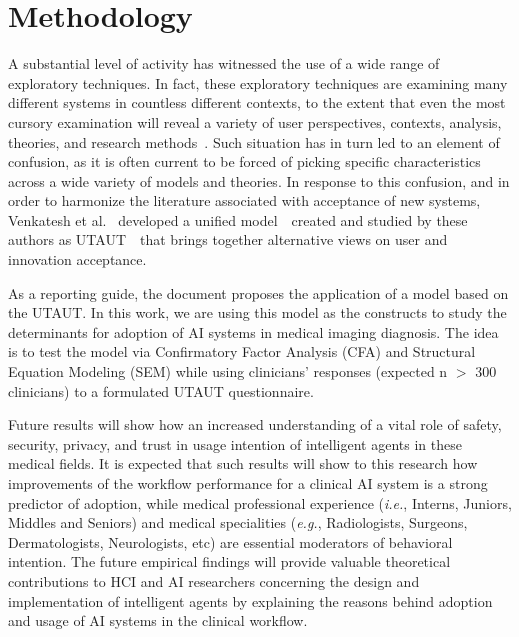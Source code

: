 
\section{Methodology}
\label{sec:sec003}

A substantial level of activity has witnessed the use of a wide range of exploratory techniques.
In fact, these exploratory techniques are examining many different systems in countless different contexts, to the extent that even the most cursory examination will reveal a variety of user perspectives, contexts, analysis, theories, and research methods~\cite{williams2015unified}.
Such situation has in turn led to an element of confusion, as it is often current to be forced of picking specific characteristics across a wide variety of models and theories.
In response to this confusion, and in order to harmonize the literature associated with acceptance of new systems, Venkatesh et al.~\cite{venkatesh2016unified} developed a unified model~\textendash~created and studied by these authors as UTAUT~\textendash~that brings together alternative views on user and innovation acceptance.

As a reporting guide, the document proposes the application of a model based on the UTAUT.
In this work, we are using this model as the constructs to study the determinants for adoption of AI systems in medical imaging diagnosis.
The idea is to test the model via Confirmatory Factor Analysis (CFA) and Structural Equation Modeling (SEM) while using clinicians' responses (expected n $>$ 300 clinicians) to a formulated UTAUT questionnaire.

Future results will show how an increased understanding of a vital role of safety, security, privacy, and trust in usage intention of intelligent agents in these medical fields.
It is expected that such results will show to this research how improvements of the workflow performance for a clinical AI system is a strong predictor of adoption, while medical professional experience ({\it i.e.}, Interns, Juniors, Middles and Seniors) and medical specialities ({\it e.g.}, Radiologists, Surgeons, Dermatologists, Neurologists, etc) are essential moderators of behavioral intention.
The future empirical findings will provide valuable theoretical contributions to HCI and AI researchers concerning the design and implementation of intelligent agents by explaining the reasons behind adoption and usage of AI systems in the clinical workflow.

